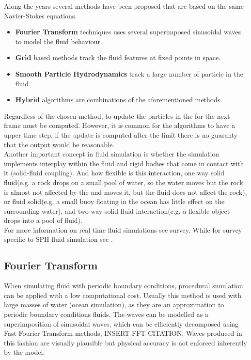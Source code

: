 Along the years several methods have been proposed that are based on the same Navier-Stokes equations.

\begin{itemize}
\item \textbf{Fourier Transform} techniques uses several superimposed sinusoidal waves to model the fluid behaviour.
\item \textbf{Grid} based methods track the fluid features at fixed points in space.
\item \textbf{Smooth Particle Hydrodynamics} track a large number of particle in the fluid.
\item \textbf{Hybrid} algorithms are combinations of the aforementioned methods.\\
\end{itemize}

Regardless of the chosen method, to update the particles in the for the next frame must be computed.
However, it is common for the algorithms to have a upper time step, if the update is computed after the limit there is no guaranty that the output would be reasonable.\\

Another important concept in fluid simulation is whether the simulation implements interplay within the fluid and rigid bodies that come in contact with it (solid-fluid coupling).
And how flexible is this interaction, one way solid fluid(e.g. a rock drops on a small pool of water, so the water moves but the rock is almost not affected by the  and moves it, but the fluid does not affect the rock), or fluid solid(e.g. a small buoy floating in the ocean has little effect on the surrounding water), and two way solid fluid interaction(e.g. a flexible object drops into a pool of fluid).\\

For more information on real time fluid simulations see \cite{Vines2012} survey.
While for survey specific to SPH fluid simulation see \cite{Ihmsen2014}.

\subsection{Fourier Transform}

When simulating fluid with periodic boundary conditions, procedural simulation can be applied with a low computational cost.
Usually this method is used with large masses of water (ocean simulation), as they are an approximation to periodic boundary conditions fluids.
The waves can be modelled as a superimposition of sinusoidal waves, which can be efficiently decomposed using Fast Fourier Transform methods, INSERT FFT CITATION.
Waves produced in this fashion are visually plausible but physical accuracy is not enforced inherently by the model.\\

